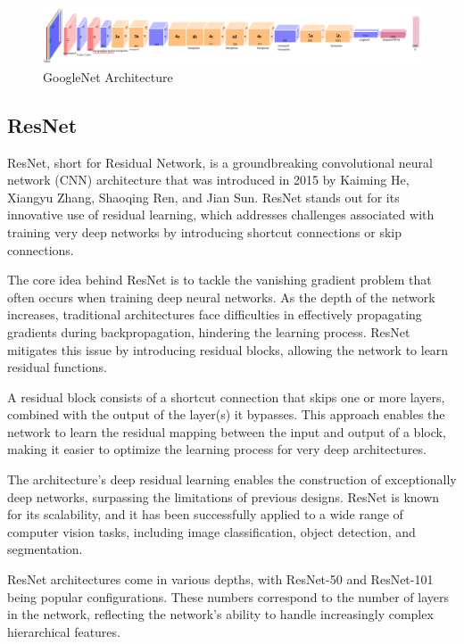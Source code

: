 \documentclass{report}
\begin{document}
\begin{figure}[ht]
	\includegraphics[width=350pt]{53}
	\centering
	\caption{GoogleNet Architecture}
\end{figure}

\subsection{ResNet}

ResNet, short for Residual Network, is a groundbreaking convolutional neural network (CNN) architecture that was introduced in 2015 by Kaiming He, Xiangyu Zhang, Shaoqing Ren, and Jian Sun. ResNet stands out for its innovative use of residual learning, which addresses challenges associated with training very deep networks by introducing shortcut connections or skip connections.

The core idea behind ResNet is to tackle the vanishing gradient problem that often occurs when training deep neural networks. As the depth of the network increases, traditional architectures face difficulties in effectively propagating gradients during backpropagation, hindering the learning process. ResNet mitigates this issue by introducing residual blocks, allowing the network to learn residual functions.

A residual block consists of a shortcut connection that skips one or more layers, combined with the output of the layer(s) it bypasses. This approach enables the network to learn the residual mapping between the input and output of a block, making it easier to optimize the learning process for very deep architectures.

The architecture's deep residual learning enables the construction of exceptionally deep networks, surpassing the limitations of previous designs. ResNet is known for its scalability, and it has been successfully applied to a wide range of computer vision tasks, including image classification, object detection, and segmentation.

ResNet architectures come in various depths, with ResNet-50 and ResNet-101 being popular configurations. These numbers correspond to the number of layers in the network, reflecting the network's ability to handle increasingly complex hierarchical features.
\end{document}

